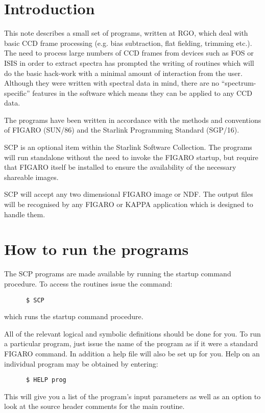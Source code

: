 \newpage
\section{Introduction}

This note describes a small set of programs, written at RGO, which deal with
basic CCD frame processing (e.g. bias subtraction, flat fielding, trimming
etc.).  The need to process large numbers of CCD frames from devices such as
FOS or ISIS in order to extract spectra has prompted the writing of routines
which will do the basic hack-work with a minimal amount of interaction from the
user. Although they were written with spectral data in mind, there are no
``spectrum-specific'' features in the software which means they can be applied
to any CCD data.

The programs have been written in accordance with the methods and
conventions of FIGARO (SUN/86) and the Starlink Programming Standard (SGP/16).

SCP is an optional item within the Starlink Software Collection. The programs
will run standalone without the need to invoke the FIGARO startup, but require
that FIGARO itself be installed to ensure the availability of the necessary
shareable images.

SCP will accept any two dimensional FIGARO image or NDF. The output files will
be recognised by any FIGARO or KAPPA application which is designed to handle
them.

\section{How to run the programs}

The SCP programs are made available by running the startup command procedure.
To access the routines issue the command:
\begin{verbatim}
      $ SCP
\end{verbatim}
which runs the startup command procedure.

All of the relevant logical and symbolic definitions should be done for
you. To run a particular program, just issue the name of the program as if
it were a standard FIGARO command. In addition a help file will also be 
set up for you. Help on an individual program may be obtained by entering:
\begin{verbatim}
      $ HELP prog
\end{verbatim}
This will give you a list of the program's input parameters as well as an 
option to look at the source header comments for the main routine.

